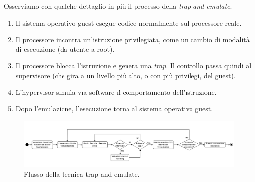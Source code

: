 Osserviamo con qualche dettaglio in più il processo della \textit{trap and emulate}.
\begin{enumerate}
    \item Il sistema operativo guest esegue codice normalmente sul processore reale.
    \item Il processore incontra un'istruzione privilegiata, come un cambio di modalità di esecuzione (da utente a root).
    \item Il processore blocca l’istruzione e genera una \textit{trap}. Il controllo passa quindi al supervisore (che gira a un livello più alto, o con più privilegi, del guest).
    \item L’hypervisor simula via software il comportamento dell’istruzione.
    \item Dopo l’emulazione, l’esecuzione torna al sistema operativo guest.
\end{enumerate}

\begin{figure}[!h]
    \centering
    \includegraphics[width=1.1\linewidth]{img/trap-and-emulate.png}
    \caption{Flusso della tecnica trap and emulate.}
    \label{fig:trap-and-emulate}
\end{figure}

